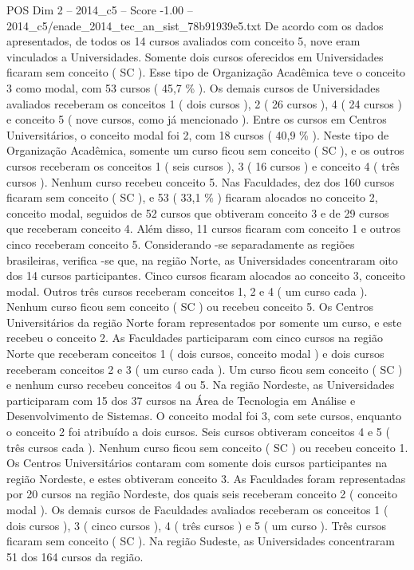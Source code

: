\begin{textsample}{POS Dim 2 – 2014\_c5 – Score -1.00 – 2014\_c5/enade\_2014\_tec\_an\_sist\_78b91939e5.txt}
De acordo com os dados apresentados, de todos os 14 cursos avaliados com conceito 5, nove eram vinculados a Universidades.
Somente dois cursos oferecidos em Universidades ficaram sem conceito ( SC ).
Esse tipo de Organização Acadêmica teve o conceito 3 como modal, com 53 cursos ( 45,7 \% ).
Os demais cursos de Universidades avaliados receberam os conceitos 1 ( dois cursos ), 2 ( 26 cursos ), 4 ( 24 cursos ) e conceito 5 ( nove cursos, como já mencionado ).
Entre os cursos em Centros Universitários, o conceito modal foi 2, com 18 cursos ( 40,9 \% ).
Neste tipo de Organização Acadêmica, somente um curso ficou sem conceito ( SC ), e os outros cursos receberam os conceitos 1 ( seis cursos ), 3 ( 16 cursos ) e conceito 4 ( três cursos ).
Nenhum curso recebeu conceito 5.
Nas Faculdades, dez dos 160 cursos ficaram sem conceito ( SC ), e 53 ( 33,1 \% ) ficaram alocados no conceito 2, conceito modal, seguidos de 52 cursos que obtiveram conceito 3 e de 29 cursos que receberam conceito 4.
Além disso, 11 cursos ficaram com conceito 1 e outros cinco receberam conceito 5.
Considerando -se separadamente as regiões brasileiras, verifica -se que, na região Norte, as Universidades concentraram oito dos 14 cursos participantes.
Cinco cursos ficaram alocados ao conceito 3, conceito modal.
Outros três cursos receberam conceitos 1, 2 e 4 ( um curso cada ).
Nenhum curso ficou sem conceito ( SC ) ou recebeu conceito 5.
Os Centros Universitários da região Norte foram representados por somente um curso, e este recebeu o conceito 2.
As Faculdades participaram com cinco cursos na região Norte que receberam conceitos 1 ( dois cursos, conceito modal ) e dois cursos receberam conceitos 2 e 3 ( um curso cada ).
Um curso ficou sem conceito ( SC ) e nenhum curso recebeu conceitos 4 ou 5.
Na região Nordeste, as Universidades participaram com 15 dos 37 cursos na Área de Tecnologia em Análise e Desenvolvimento de Sistemas.
O conceito modal foi 3, com sete cursos, enquanto o conceito 2 foi atribuído a dois cursos.
Seis cursos obtiveram conceitos 4 e 5 ( três cursos cada ).
Nenhum curso ficou sem conceito ( SC ) ou recebeu conceito 1.
Os Centros Universitários contaram com somente dois cursos participantes na região Nordeste, e estes obtiveram conceito 3.
As Faculdades foram representadas por 20 cursos na região Nordeste, dos quais seis receberam conceito 2 ( conceito modal ).
Os demais cursos de Faculdades avaliados receberam os conceitos 1 ( dois cursos ), 3 ( cinco cursos ), 4 ( três cursos ) e 5 ( um curso ).
Três cursos ficaram sem conceito ( SC ).
Na região Sudeste, as Universidades concentraram 51 dos 164 cursos da região.

\end{textsample}
